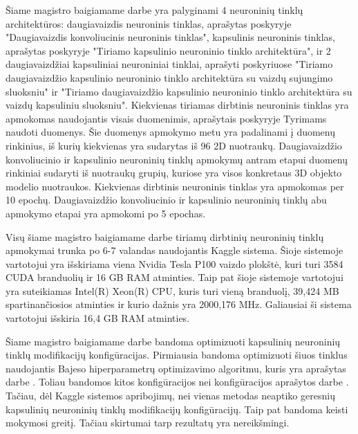 
Šiame magistro baigiamame darbe yra palyginami 4 neuroninių tinklų architektūros: daugiavaizdis neuroninis tinklas, aprašytas poskyryje "Daugiavaizdis konvoliucinis neuroninis tinklas", kapsulinis neuroninis tinklas, aprašytas poskyryje "Tiriamo kapsulinio neuroninio tinklo architektūra", ir 2 daugiavaizdžiai kapsuliniai neuroniniai tinklai, aprašyti poskyriuose "Tiriamo daugiavaizdžio kapsulinio neuroninio tinklo architektūra su vaizdų sujungimo sluoksniu" ir "Tiriamo daugiavaizdžio kapsulinio neuroninio tinklo architektūra su vaizdų kapsuliniu sluoksniu". Kiekvienas tiriamas dirbtinis neuroninis tinklas yra apmokomas naudojantis visais duomenimis, aprašytais poskyryje Tyrimams naudoti duomenys. Šie duomenys apmokymo metu yra padalinami į duomenų rinkinius, iš kurių kiekvienas yra sudarytas iš 96 2D nuotraukų. Daugiavaizdžio konvoliucinio ir kapsulinio neuroninių tinklų apmokymų antram etapui duomenų rinkiniai sudaryti iš nuotraukų grupių, kuriose yra visos konkretaus 3D objekto modelio nuotraukos. Kiekvienas dirbtinis neuroninis tinklas yra apmokomas per 10 epochų. Daugiavaizdžio konvoliucinio ir kapsulinio neuroninių tinklų abu apmokymo etapai yra apmokomi po 5 epochas.

Visų šiame magistro baigiamame darbe tiriamų dirbtinių neuroninių tinklų apmokymai trunka po 6-7 valandas naudojantis Kaggle sistema. Šioje sistemoje vartotojui yra išskiriama viena Nvidia Tesla P100 vaizdo plokštė, kuri turi 3584 CUDA branduolių ir 16 GB RAM atminties. Taip pat šioje sistemoje vartotojui yra suteikiamas Intel(R) Xeon(R) CPU, kuris turi vieną branduolį, 39,424 MB spartinančiosios atminties ir kurio dažnis yra 2000,176 MHz. Galiausiai ši sistema vartotojui išskiria 16,4 GB RAM atminties.

Šiame magistro baigiamame darbe bandoma optimizuoti kapsulinių neuroninių tinklų modifikacijų konfigūracijas. Pirmiausia bandoma optimizuoti šiuos tinklus naudojantis Bajeso hiperparametrų optimizavimo algoritmu, kuris yra aprašytas darbe \cite{bayes}. Toliau bandomos kitos konfigūracijos nei konfigūracijos aprašytos darbe \cite{capsNet}. Tačiau, dėl Kaggle sistemos apribojimų, nei vienas metodas neaptiko geresnių kapsulinių neuroninių tinklų modifikacijų konfigūracijų. Taip pat bandoma 
keisti mokymosi greitį. Tačiau skirtumai tarp rezultatų yra nereikšmingi.

